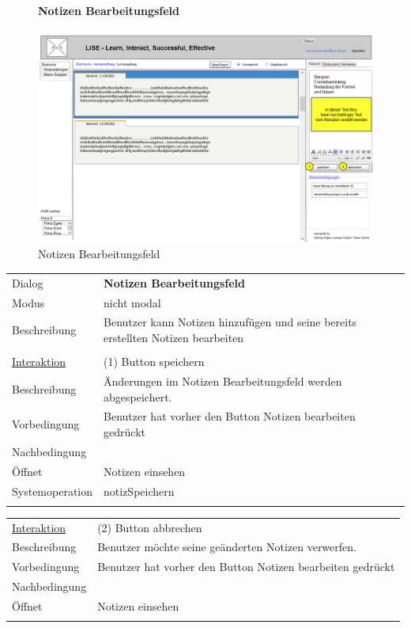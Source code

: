 \documentclass[12pt,a4paper]{article}
\begin{document}
{\begin{figure}[H]
	\paragraph{Notizen Bearbeitungsfeld}
	\includegraphics[width=\textwidth]{Bilder/Mockups/GUI/NotizAendernBearbeitungsfeld[Benutzer].png}
	\caption{Notizen Bearbeitungsfeld}
	\label{GuiNotizenBearbeitungsfeld}
\end{figure}

\begin{tabular}{l p{12cm}}
Dialog 	 		 & \textbf{Notizen Bearbeitungsfeld} \\ 
Modus 			 & nicht modal\\ 
Beschreibung   	 & Benutzer kann Notizen hinzufügen und seine bereits erstellten Notizen bearbeiten \\\\

\underline{Interaktion}  	 & (1) Button speichern\\ 
Beschreibung   	 			 & Änderungen im Notizen Bearbeitungsfeld werden abgespeichert.\\
Vorbedingung	 			 & Benutzer hat vorher den Button  Notizen bearbeiten gedrückt\\
Nachbedingung	 			 & \\
Öffnet			 			 & \glqq Notizen einsehen\grqq \\
Systemoperation & notizSpeichern\\\\
\end{tabular}

\begin{tabular}{l p{12cm}}
\underline{Interaktion} & (2) Button abbrechen  \\ 
Beschreibung   	 		& Benutzer möchte seine geänderten Notizen verwerfen. \\
Vorbedingung	 		& Benutzer hat vorher den Button  Notizen bearbeiten gedrückt\\
Nachbedingung	 		& \\
Öffnet			 		& \glqq Notizen einsehen\grqq \\\\
\end{tabular}

}
\end{document}
